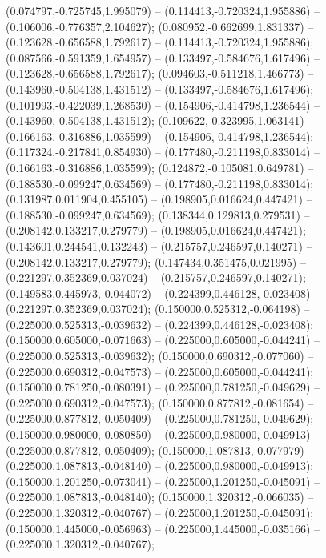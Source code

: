  (0.074797,-0.725745,1.995079) -- (0.114413,-0.720324,1.955886) -- (0.106006,-0.776357,2.104627);
 (0.080952,-0.662699,1.831337) -- (0.123628,-0.656588,1.792617) -- (0.114413,-0.720324,1.955886);
 (0.087566,-0.591359,1.654957) -- (0.133497,-0.584676,1.617496) -- (0.123628,-0.656588,1.792617);
 (0.094603,-0.511218,1.466773) -- (0.143960,-0.504138,1.431512) -- (0.133497,-0.584676,1.617496);
 (0.101993,-0.422039,1.268530) -- (0.154906,-0.414798,1.236544) -- (0.143960,-0.504138,1.431512);
 (0.109622,-0.323995,1.063141) -- (0.166163,-0.316886,1.035599) -- (0.154906,-0.414798,1.236544);
 (0.117324,-0.217841,0.854930) -- (0.177480,-0.211198,0.833014) -- (0.166163,-0.316886,1.035599);
 (0.124872,-0.105081,0.649781) -- (0.188530,-0.099247,0.634569) -- (0.177480,-0.211198,0.833014);
 (0.131987,0.011904,0.455105) -- (0.198905,0.016624,0.447421) -- (0.188530,-0.099247,0.634569);
 (0.138344,0.129813,0.279531) -- (0.208142,0.133217,0.279779) -- (0.198905,0.016624,0.447421);
 (0.143601,0.244541,0.132243) -- (0.215757,0.246597,0.140271) -- (0.208142,0.133217,0.279779);
 (0.147434,0.351475,0.021995) -- (0.221297,0.352369,0.037024) -- (0.215757,0.246597,0.140271);
 (0.149583,0.445973,-0.044072) -- (0.224399,0.446128,-0.023408) -- (0.221297,0.352369,0.037024);
 (0.150000,0.525312,-0.064198) -- (0.225000,0.525313,-0.039632) -- (0.224399,0.446128,-0.023408);
 (0.150000,0.605000,-0.071663) -- (0.225000,0.605000,-0.044241) -- (0.225000,0.525313,-0.039632);
 (0.150000,0.690312,-0.077060) -- (0.225000,0.690312,-0.047573) -- (0.225000,0.605000,-0.044241);
 (0.150000,0.781250,-0.080391) -- (0.225000,0.781250,-0.049629) -- (0.225000,0.690312,-0.047573);
 (0.150000,0.877812,-0.081654) -- (0.225000,0.877812,-0.050409) -- (0.225000,0.781250,-0.049629);
 (0.150000,0.980000,-0.080850) -- (0.225000,0.980000,-0.049913) -- (0.225000,0.877812,-0.050409);
 (0.150000,1.087813,-0.077979) -- (0.225000,1.087813,-0.048140) -- (0.225000,0.980000,-0.049913);
 (0.150000,1.201250,-0.073041) -- (0.225000,1.201250,-0.045091) -- (0.225000,1.087813,-0.048140);
 (0.150000,1.320312,-0.066035) -- (0.225000,1.320312,-0.040767) -- (0.225000,1.201250,-0.045091);
 (0.150000,1.445000,-0.056963) -- (0.225000,1.445000,-0.035166) -- (0.225000,1.320312,-0.040767);
